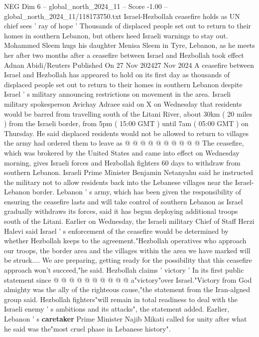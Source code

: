 \begin{textsample}{NEG Dim 6 – global\_north\_2024\_11 – Score -1.00 – global\_north\_2024\_11/118173750.txt}  \label{ex:f6_neg_100}
Israel-Hezbollah ceasefire holds as UN chief sees ' ray of hope ' Thousands of displaced people set out to return to their homes in southern Lebanon, but others heed Israeli warnings to stay out.
Mohammed Sleem hugs his daughter Menisa Sleem in Tyre, Lebanon, as he meets her after two months after a ceasefire between Israel and Hezbollah took effect Adnan Abidi/Reuters Published On 27 Nov 202427 Nov 2024 A ceasefire between Israel and Hezbollah has appeared to hold on its first day as thousands of displaced people set out to return to their homes in southern Lebanon despite Israel ' s military announcing restrictions on movement in the area.
Israeli military spokesperson Avichay Adraee said on X on Wednesday that residents would be barred from travelling south of the Litani River, about 30km ( 20 miles ) from the Israeli border, from 5pm ( 15:00 GMT ) until 7am ( 05:00 GMT ) on Thursday.
He said displaced residents would not be allowed to return to villages the army had ordered them to leave as @ @ @ @ @ @ @ @ @ @ The ceasefire, which was brokered by the United States and came into effect on Wednesday morning, gives Israeli forces and Hezbollah fighters 60 days to withdraw from southern Lebanon.
Israeli Prime Minister Benjamin Netanyahu said he instructed the military not to allow residents back into the Lebanese villages near the Israel-Lebanon border.
Lebanon ' s army, which has been given the responsibility of ensuring the ceasefire lasts and will take control of southern Lebanon as Israel gradually withdraws its forces, said it has begun deploying additional troops south of the Litani.
Earlier on Wednesday, the Israeli military Chief of Staff Herzi Halevi said Israel ' s enforcement of the ceasefire would be determined by whether Hezbollah keeps to the agreement."Hezbollah operatives who approach our troops, the border area and the villages within the area we have marked will be struck....
We are preparing, getting ready for the possibility that this ceasefire approach won't succeed,"he said.
Hezbollah claims ' victory ' In its first public statement since @ @ @ @ @ @ @ @ @ @ a"victory"over Israel."Victory from God almighty was the ally of the righteous cause,"the statement from the Iran-algned group said.
Hezbollah fighters"will remain in total readiness to deal with the Israeli enemy ' s ambitions and its attacks", the statement added.
Earlier, Lebanon ' s \textbf{caretaker} Prime Minister Najib Mikati called for unity after what he said was the"most cruel phase in Lebanese history".

\end{textsample}
